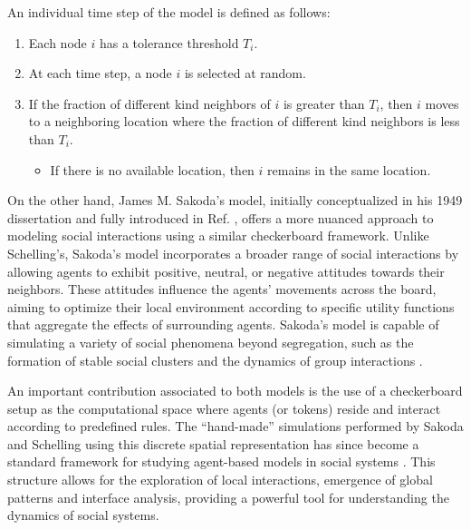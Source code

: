 \begin{theorem}
    An individual time step of the model is defined as follows:
    \begin{enumerate}
        \item Each node $i$ has a tolerance threshold $T_i$.
        \item At each time step, a node $i$ is selected at random.
        \item If the fraction of different kind neighbors of $i$ is greater than $T_i$, then $i$ moves to a neighboring location where the fraction of different kind neighbors is less than $T_i$.
            \begin{itemize}
                \item If there is no available location, then $i$ remains in the same location.
            \end{itemize}
    \end{enumerate}
\end{theorem}

On the other hand, James M. Sakoda's model, initially conceptualized in his 1949 dissertation and fully introduced in Ref. \cite{sakoda1971checkerboard}, offers a more nuanced approach to modeling social interactions using a similar checkerboard framework. Unlike Schelling's, Sakoda's model incorporates a broader range of social interactions by allowing agents to exhibit positive, neutral, or negative attitudes towards their neighbors. These attitudes influence the agents' movements across the board, aiming to optimize their local environment according to specific utility functions that aggregate the effects of surrounding agents. Sakoda's model is capable of simulating a variety of social phenomena beyond segregation, such as the formation of stable social clusters and the dynamics of group interactions \cite{hegselmann-2017}. 

An important contribution associated to both models is the use of a checkerboard setup as the computational space where agents (or tokens) reside and interact according to predefined rules. The ``hand-made'' simulations performed by Sakoda and Schelling using this discrete spatial representation has since become a standard framework for studying agent-based models in social systems \cite{hegselmann-2017}. This structure allows for the exploration of local interactions, emergence of global patterns and interface analysis, providing a powerful tool for understanding the dynamics of social systems.

